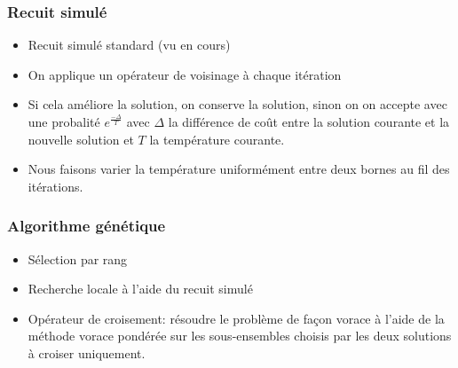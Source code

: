 \documentclass[aspectratio=169,11pt]{beamer}
\begin{document}
	\begin{frame}
		\centering
		
	\end{frame}

	\begin{frame}
		\frametitle{Recuit simulé}
		\begin{itemize}
			\item Recuit simulé standard (vu en cours)
			\item On applique un opérateur de voisinage à chaque itération
			\item Si cela améliore la solution, on conserve la solution, sinon on on accepte avec une
				probalité \(e^{\frac{-\Delta}{T}}\) avec \(\Delta\) la différence de coût
				entre la solution courante et la nouvelle solution et \(T\) la température courante.
			\item Nous faisons varier la température uniformément entre deux bornes au fil des itérations.
		\end{itemize}
	\end{frame}

	\begin{frame}
		\frametitle{Algorithme génétique}
		\begin{itemize}
			\item Sélection par rang
			\item Recherche locale à l'aide du recuit simulé
			\item Opérateur de croisement: résoudre le problème de façon vorace à l'aide de la méthode vorace pondérée
				sur les sous-ensembles choisis par les deux solutions à croiser uniquement.
		\end{itemize}
	\end{frame}
\end{document}

